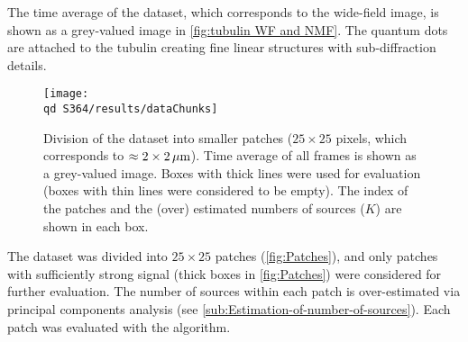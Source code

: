 The time average of the dataset, which corresponds to the wide-field image, is shown as a grey-valued image in \autoref{fig:tubulin WF and NMF}\aaa. The quantum dots are attached to the tubulin creating fine linear structures with sub-diffraction details. 

\begin{figure}[!htb]
	\centering
	\texttt{[image: \\qd S364/results/dataChunks]}
	\caption{Division of the dataset into smaller patches ($25\times25$ pixels, which corresponds to $\approx 2\times2 \, \mathrm{\mu m}$). Time average of all frames is shown as a grey-valued image. Boxes with thick lines were used for \inmf{} evaluation (boxes with thin lines were considered to be empty). The index of the patches and the (over) estimated numbers of sources ($K$) are shown in each box.}
	\label{fig:Patches}
\end{figure}
%
The dataset was divided into $25 \times 25$ patches (\autoref{fig:Patches}), and only patches with sufficiently strong signal (thick boxes in \autoref{fig:Patches}) were considered for further evaluation. The number of sources within each patch is over-estimated via principal components analysis (see \autoref{sub:Estimation-of-number-of-sources}). Each patch was evaluated with the \inmf{} algorithm.

